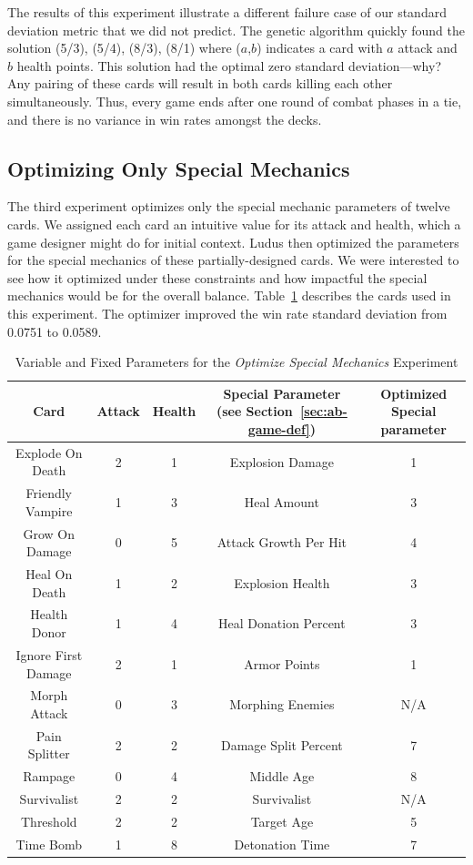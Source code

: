 \documentclass[letterpaper]{article} %
\begin{document}
The results of this experiment illustrate a different failure case of our standard deviation metric that we did not predict. The genetic algorithm quickly found the solution (5/3), (5/4), (8/3), (8/1) where ($a$,$b$) indicates a card with $a$ attack and $b$ health points. This solution had the optimal zero standard deviation---why? Any pairing of these cards will result in both cards killing each other simultaneously. Thus, every game ends after one round of combat phases in a tie, and there is no variance in win rates amongst the decks. 

 \subsection{Optimizing Only Special Mechanics}

The third experiment optimizes only the special mechanic parameters of twelve cards. We assigned each card an intuitive value for its attack and health, which a game designer might do for initial context. {\sc Ludus} then optimized the parameters for the special mechanics of these partially-designed cards. We were interested to see how it %
optimized under these constraints and how impactful the special mechanics would be for the overall balance. %
Table~\ref{tab:special_cards} describes the cards used in this experiment. The optimizer improved the win rate standard deviation from 0.0751 to 0.0589. 

\begin{table}[t]
\centering
\caption{Variable and Fixed Parameters for the \textit{Optimize Special Mechanics} Experiment}
\label{tab:special_cards}
\begin{tabular}{||c c c c c||} 
 \hline
 Card & Attack & Health & Special Parameter (see Section~\ref{sec:ab-game-def}) &  Optimized Special parameter\\ [0.5ex] 
 \hline\hline
 Explode On Death & 2 & 1 & Explosion Damage & 1\\ 
 \hline
 Friendly Vampire & 1 & 3 & Heal Amount & 3 \\
 \hline
 Grow On Damage & 0 & 5 & Attack Growth Per Hit & 4 \\
 \hline
 Heal On Death & 1 & 2 & Explosion Health & 3 \\
 \hline
 Health Donor & 1 & 4 & Heal Donation Percent & 3 \\
 \hline
 Ignore First Damage & 2 & 1 & Armor Points & 1 \\
 \hline
 Morph Attack & 0 & 3 & Morphing Enemies & N/A \\
 \hline
 Pain Splitter & 2 & 2 & Damage Split Percent & 7 \\
 \hline
 Rampage & 0 & 4 & Middle Age & 8 \\
 \hline
 Survivalist & 2 & 2 & Survivalist & N/A \\
 \hline
 Threshold & 2 & 2 & Target Age & 5 \\
 \hline
 Time Bomb & 1 & 8 & Detonation Time & 7 \\ 
 \hline
\end{tabular}
\end{table}
\end{document}
